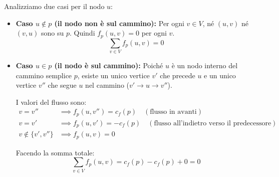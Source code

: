 \begin{itemize}
    Analizziamo due casi per il nodo $u$:

    \begin{itemize}
        \item \textbf{Caso $u \notin p$ (il nodo non è sul cammino):}
        Per ogni $v \in V$, né $(u,v)$ né $(v,u)$ sono su $p$.
        Quindi $f_p(u,v) = 0$ per ogni $v$.
        \[ \sum_{v \in V} f_p(u,v) = 0 \]

        \item \textbf{Caso $u \in p$ (il nodo è sul cammino):}
        Poiché $u$ è un nodo interno del cammino semplice $p$, esiste un unico vertice $v'$ che precede $u$ e un unico vertice $v''$ che segue $u$ nel cammino ($v' \to u \to v''$).
        
        I valori del flusso sono:
        \begin{align*}
            v = v'' & \implies f_p(u,v'') = c_f(p) \quad (\text{flusso in avanti}) \\
            v = v'  & \implies f_p(u,v') = -c_f(p) \quad (\text{flusso all'indietro verso il predecessore}) \\
            v \notin \{v', v''\} & \implies f_p(u,v) = 0
        \end{align*}
        
        Facendo la somma totale:
        \[ \sum_{v \in V} f_p(u,v) = c_f(p) - c_f(p) + 0 = 0 \]
    \end{itemize}
\end{itemize}
